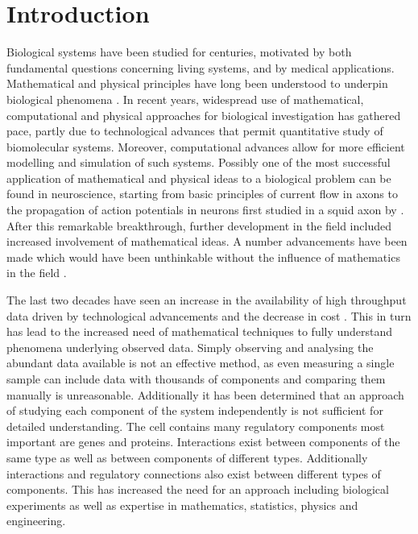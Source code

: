 
\chapter{Introduction}
\label{cha:introduction}

Biological systems have been studied for centuries, motivated by both fundamental questions concerning living systems, and by medical applications. Mathematical and physical principles have long been understood to underpin biological phenomena \citep{Lotka:1925tu, Rashevsky:1935jt}. In recent years,  widespread use of mathematical, computational and physical approaches for biological investigation has gathered pace, partly due to technological advances that permit quantitative study of biomolecular systems. Moreover, computational advances allow for more efficient modelling and simulation of such systems.
Possibly one of the most successful application of mathematical and physical ideas to a biological problem can be found in neuroscience, starting from basic principles of current flow in axons to the propagation of action potentials in neurons first studied in a
squid axon by \cite{Hodgkin:1952td}. After this remarkable breakthrough, further development in the field included increased involvement of mathematical ideas. A number advancements have been made which would have been unthinkable without the influence of mathematics in the field \citep{Amari201348}.

The last two decades have seen an increase in the availability of high throughput data driven by technological advancements and the decrease in cost \citep{Schadt:2010dp}. This in turn has lead to the increased need of mathematical techniques to fully understand phenomena underlying observed data. Simply observing and analysing the abundant data available is not an effective method,
as even measuring a single sample can include data with thousands of components and comparing them manually is unreasonable.
Additionally it has been determined that an approach of studying each component of the system independently is not sufficient for detailed understanding.
The cell contains many regulatory components most important are genes and proteins. Interactions exist between components of the same type as well as between components of different types.
Additionally  interactions and regulatory connections also exist between different types of components. This has increased the need for an approach including biological experiments as well as expertise in mathematics, statistics, physics and engineering.

